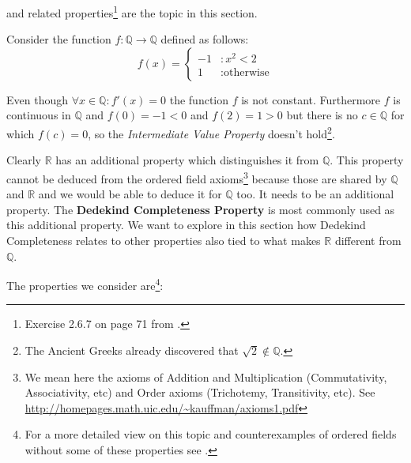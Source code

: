  and related properties\footnote{Exercise 2.6.7 on page 71 from .} are the topic in this section.
\newline

Consider the function $f: \mathbb{Q} \to \mathbb{Q}$ defined as follows:
$$
f(x) = \begin{cases}
         -1 & : x^2 < 2\\
         1 & : \text{otherwise}
      \end{cases}
$$

Even though $\forall x \in \mathbb{Q}: f'(x) = 0$ the function $f$ is not constant. Furthermore $f$ is continuous in $\mathbb{Q}$ and $f(0) = -1 < 0$ and $f(2) = 1 > 0$ but there is no $c \in \mathbb{Q}$ for which $f(c) = 0$, so the \textit{Intermediate Value Property} doesn't hold\footnote{The Ancient Greeks already discovered that $\sqrt{2} \notin \mathbb{Q}$.}. 

Clearly $\mathbb{R}$ has an additional property which distinguishes it from $\mathbb{Q}$. This property cannot be deduced from the ordered field axioms\footnote{We mean here the axioms of Addition and Multiplication (Commutativity, Associativity, etc) and Order axioms (Trichotemy, Transitivity, etc). See \url{http://homepages.math.uic.edu/~kauffman/axioms1.pdf}} because those are shared by $\mathbb{Q}$ and $\mathbb{R}$ and we would be able to deduce it for $\mathbb{Q}$ too. It needs to be an additional property. The \textbf{Dedekind Completeness Property} is most commonly used as this additional property. We want to explore in this section how Dedekind Completeness relates to other properties also tied to what makes $\mathbb{R}$ different from $\mathbb{Q}$.

The properties we consider are\footnote{For a more detailed view on this topic and counterexamples of ordered fields without some of these properties see .}:

